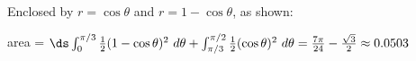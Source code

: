 {Enclosed by $r=\cos\theta$ and $r=1-\cos\theta$, as shown:

}
{area = $\ds \int_{0}^{\pi/3} \frac12 (1-\cos\theta)^2\ d\theta +\int_{\pi/3}^{\pi/2} \frac12 (\cos\theta)^2\ d\theta =\frac{7\pi}{24}-\frac{\sqrt{3}}2\approx 0.0503$}
